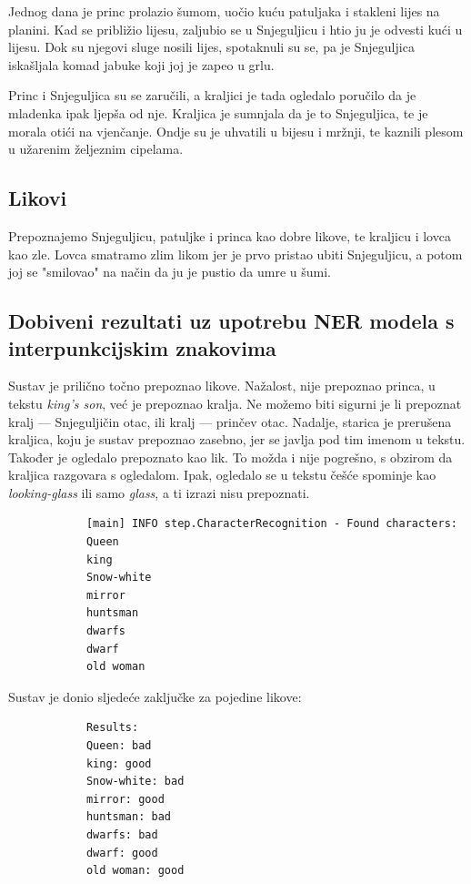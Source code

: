 \documentclass[a4paper,twoside,12pt]{memoir} %
\newcommand{\ti}[1]{\textit{#1\/}}
\begin{document}
		Jednog dana je princ prolazio šumom, uočio kuću patuljaka i stakleni lijes na planini. Kad se približio lijesu, zaljubio se u Snjeguljicu i htio ju je odvesti kući u lijesu. Dok su njegovi sluge nosili lijes, spotaknuli su se, pa je Snjeguljica iskašljala komad jabuke koji joj je zapeo u grlu.

		Princ i Snjeguljica su se zaručili, a kraljici je tada ogledalo poručilo da je mladenka ipak ljepša od nje. Kraljica je sumnjala da je to Snjeguljica, te je morala otići na vjenčanje. Ondje su je uhvatili u bijesu i mržnji, te kaznili plesom u užarenim željeznim cipelama.

		\subsection{Likovi}

		Prepoznajemo Snjeguljicu, patuljke i princa kao dobre likove, te kraljicu i lovca kao zle. Lovca smatramo zlim likom jer je prvo pristao ubiti Snjeguljicu, a potom joj se "smilovao" na način da ju je pustio da umre u šumi.

		\subsection{Dobiveni rezultati uz upotrebu NER modela s interpunkcijskim znakovima}

		Sustav je prilično točno prepoznao likove. Nažalost, nije prepoznao princa, u tekstu \ti{king's son}, već je prepoznao kralja. Ne možemo biti sigurni je li prepoznat kralj --- Snjeguljičin otac, ili kralj --- prinčev otac. Nadalje, starica je prerušena kraljica, koju je sustav prepoznao zasebno, jer se javlja pod tim imenom u tekstu. Također je ogledalo prepoznato kao lik. To možda i nije pogrešno, s obzirom da kraljica razgovara s ogledalom. Ipak, ogledalo se u tekstu češće spominje kao \ti{looking-glass} ili samo \ti{glass}, a ti izrazi nisu prepoznati.

		\begin{verbatim}
			[main] INFO step.CharacterRecognition - Found characters:
			Queen
			king
			Snow-white
			mirror
			huntsman
			dwarfs
			dwarf
			old woman
		\end{verbatim}

		Sustav je donio sljedeće zaključke za pojedine likove:

		\begin{verbatim}
			Results:
			Queen: bad
			king: good
			Snow-white: bad
			mirror: good
			huntsman: bad
			dwarfs: bad
			dwarf: good
			old woman: good
		\end{verbatim}
\end{document}
